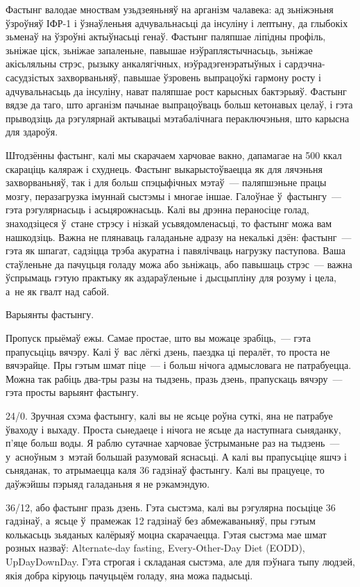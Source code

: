 Фастынг валодае мноствам узьдзеяньняў на арганізм чалавека: ад зьніжэньня ўзроўняў ІФР-1 і ўзнаўленьня адчувальнасьці да інсуліну і лептыну, да глыбокіх зьменаў на ўзроўні актыўнасьці генаў. Фастынг паляпшае ліпідны профіль, зьніжае ціск, зьніжае запаленьне, павышае нэўраплястычнасьць, зьніжае акісьляльны стрэс, рызыку анкалягічных, нэўрадэгенэратыўных і сардэчна-сасудзістых захворваньняў, павышае ўзровень выпрацоўкі гармону росту і адчувальнасьць да інсуліну, нават паляпшае рост карысных бактэрыяў. Фастынг вядзе да таго, што арганізм пачынае выпрацоўваць больш кетонавых целаў, і гэта прыводзіць да рэгулярнай актывацыі мэтабалічнага пераключэньня, што карысна для здароўя.

Штодзённы фастынг, калі мы скарачаем харчовае вакно, дапамагае на 500 ккал скараціць каляраж і схуднець. Фастынг выкарыстоўваецца як для лячэньня захворваньняў, так і для больш спэцыфічных мэтаў~--- паляпшэньне працы мозгу, перазагрузка імуннай сыстэмы і многае іншае. Галоўнае ў~фастынгу~--- гэта рэгулярнасьць і асьцярожнасьць. Калі вы дрэнна пераносіце голад, знаходзіцеся ў~стане стрэсу і нізкай усьвядомленасьці, то фастынг можа вам нашкодзіць. Важна не плянаваць галаданьне адразу на некалькі дзён: фастынг~--- гэта як шпагат, садзіцца трэба акуратна і павялічваць нагрузку паступова. Ваша стаўленьне да пачуцьця голаду можа або зьніжаць, або павышаць стрэс~--- важна ўспрымаць гэтую практыку як аздараўленьне і дысцыпліну для розуму і цела, а~не як гвалт над сабой.

Варыянты фастынгу.

Пропуск прыёмаў ежы. Самае простае, што вы можаце зрабіць,~--- гэта прапусьціць вячэру. Калі ў~вас лёгкі дзень, паездка ці пералёт, то проста не вячэрайце. Пры гэтым шмат піце~--- і больш нічога адмысловага не патрабуецца. Можна так рабіць два-тры разы на тыдзень, празь дзень, прапускаць вячэру~--- гэта просты варыянт фастынгу.

24/0. Зручная схэма фастынгу, калі вы не ясьце роўна суткі, яна не патрабуе ўваходу і выхаду. Проста сьнедаеце і нічога не ясьце да наступнага сьняданку, п'яце больш воды. Я раблю сутачнае харчовае ўстрыманьне раз на тыдзень~--- у~асноўным з~мэтай большай разумовай яснасьці. А калі вы прапусьціце яшчэ і сьняданак, то атрымаецца каля 36 гадзінаў фастынгу. Калі вы працуеце, то даўжэйшы пэрыяд галаданьня я не рэкамэндую.

36/12, або фастынг празь дзень. Гэта сыстэма, калі вы рэгулярна посьціце 36 гадзінаў, а~ясьце ў~прамежак 12 гадзінаў без абмежаваньняў, пры гэтым колькасьць зьяданых калёрыяў моцна скарачаецца. Гэтая сыстэма мае шмат розных назваў: Alternate-day fasting, Every-Other-Day Diet (EODD), UpDayDownDay. Гэта строгая і складаная сыстэма, але для пэўнага тыпу людзей, якія добра кіруюць пачуцьцём голаду, яна можа падысьці.

